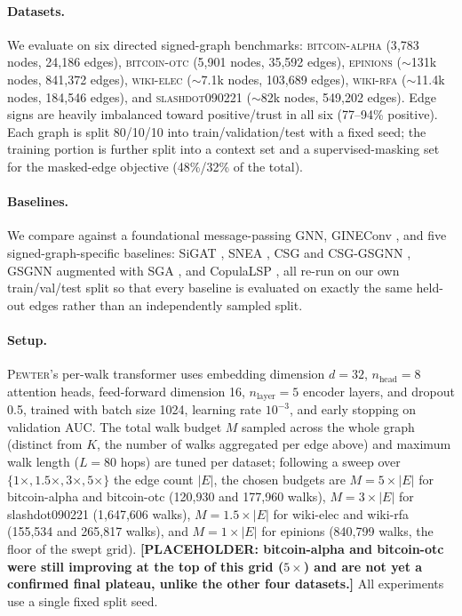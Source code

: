 \documentclass[letterpaper]{article} %
\newcommand{\method}{\textsc{Pewter}\xspace}
\newcommand{\ph}[1]{\textbf{[#1]}}  %
\theoremstyle{plain}
\theoremstyle{definition}
\begin{document}
\paragraph{Datasets.} We evaluate on six directed signed-graph benchmarks: \textsc{bitcoin-alpha} (3{,}783 nodes, 24{,}186 edges), \textsc{bitcoin-otc} (5{,}901 nodes, 35{,}592 edges), \textsc{epinions} ($\sim$131k nodes, 841{,}372 edges), \textsc{wiki-elec} ($\sim$7.1k nodes, 103{,}689 edges), \textsc{wiki-rfa} ($\sim$11.4k nodes, 184{,}546 edges), and \textsc{slashdot090221} ($\sim$82k nodes, 549{,}202 edges). Edge signs are heavily imbalanced toward positive/trust in all six (77--94\% positive). Each graph is split 80/10/10 into train/validation/test with a fixed seed; the training portion is further split into a context set and a supervised-masking set for the masked-edge objective (48\%/32\% of the total).

\paragraph{Baselines.} We compare against a foundational message-passing GNN, GINEConv \citep{PLACEHOLDER: Xu et al. 2019 GIN / Hu et al. edge-featured GINE}, and five signed-graph-specific baselines: SiGAT \citep{PLACEHOLDER}, SNEA \citep{PLACEHOLDER}, CSG and CSG-GSGNN \citep{PLACEHOLDER}, GSGNN augmented with SGA \citep{PLACEHOLDER: Signed Graph Augmentation}, and CopulaLSP \citep{PLACEHOLDER: CopulaLSP, ICLR 2026}, all re-run on our own train/val/test split so that every baseline is evaluated on exactly the same held-out edges rather than an independently sampled split.

\paragraph{Setup.} \method's per-walk transformer uses embedding dimension $d=32$, $n_\text{head}=8$ attention heads, feed-forward dimension 16, $n_\text{layer}=5$ encoder layers, and dropout 0.5, trained with batch size 1024, learning rate $10^{-3}$, and early stopping on validation AUC. The total walk budget $M$ sampled across the whole graph (distinct from $K$, the number of walks aggregated per edge above) and maximum walk length ($L=80$ hops) are tuned per dataset; following a sweep over $\{1\times, 1.5\times, 3\times, 5\times\}$ the edge count $|E|$, the chosen budgets are $M=5\times|E|$ for bitcoin-alpha and bitcoin-otc (120{,}930 and 177{,}960 walks), $M=3\times|E|$ for slashdot090221 (1{,}647{,}606 walks), $M=1.5\times|E|$ for wiki-elec and wiki-rfa (155{,}534 and 265{,}817 walks), and $M=1\times|E|$ for epinions (840{,}799 walks, the floor of the swept grid). \ph{PLACEHOLDER: bitcoin-alpha and bitcoin-otc were still improving at the top of this grid ($5\times$) and are not yet a confirmed final plateau, unlike the other four datasets.} All experiments use a single fixed split seed.
\end{document}
